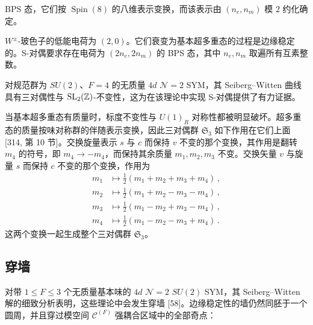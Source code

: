 BPS 态，它们按 $\operatorname{Spin}(8)$ 的八维表示变换，而该表示由 $(n_e,n_m)$ 模 $2$ 约化确定。

$W^\pm$-玻色子的低能电荷为 $(2,0)$。它们衰变为基本超多重态的过程是边缘稳定的。S-对偶要求存在电荷为 $(2n_e,2n_m)$ 的 BPS 态，其中 $n_e,n_m$ 取遍所有互素整数。

对规范群为 $SU(2)$、$F=4$ 的无质量 $4d$ $\mathcal{N}=2$ SYM，其 Seiberg–Witten 曲线具有三对偶性与 $\operatorname{SL}_2(\mathbb{Z})$-不变性，这为在该理论中实现 S-对偶提供了有力证据。

当基本超多重态有质量时，标度不变性与 $U(1)_R$ 对称性都被明显破坏。超多重态的质量按味对称群的伴随表示变换，因此三对偶群 $\mathfrak{S}_3$ 如下作用在它们上面 [314, 第 10 节]。交换旋量表示 $s$ 与 $c$ 而保持 $v$ 不变的那个变换，其作用是翻转 $m_4$ 的符号，即 $m_4\to-m_4$，而保持其余质量 $m_1,m_2,m_3$ 不变。交换矢量 $v$ 与旋量 $s$ 而保持 $c$ 不变的那个变换，作用为
\begin{equation}
\begin{aligned}
m_1&\mapsto \tfrac{1}{2}(m_1+m_2+m_3+m_4)\,,\\
m_2&\mapsto \tfrac{1}{2}(m_1+m_2-m_3-m_4)\,,\\
m_3&\mapsto \tfrac{1}{2}(m_1-m_2+m_3-m_4)\,,\\
m_4&\mapsto \tfrac{1}{2}(m_1-m_2-m_3+m_4)\,.
\end{aligned}\tag{20.14}
\end{equation}
这两个变换一起生成整个三对偶群 $\mathfrak{S}_3$。

\subsection{穿墙}

对带 $1\le F\le 3$ 个无质量基本味的 $4d$ $\mathcal{N}=2$ $SU(2)$ SYM，其 Seiberg–Witten 解的细致分析表明，这些理论中会发生穿墙 [58]。边缘稳定性的墙仍然同胚于一个圆周，并且穿过模空间 $\mathcal{C}^{(F)}$ 强耦合区域中的全部奇点：

